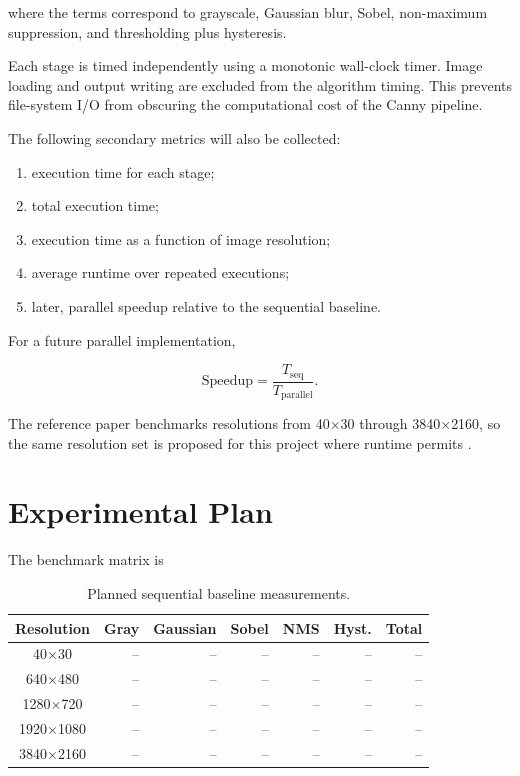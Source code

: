 \documentclass[conference]{IEEEtran}
\begin{document}
where the terms correspond to grayscale, Gaussian blur, Sobel, non-maximum
suppression, and thresholding plus hysteresis.

Each stage is timed independently using a monotonic wall-clock timer.
Image loading and output writing are excluded from the algorithm timing.
This prevents file-system I/O from obscuring the computational cost of the
Canny pipeline.

The following secondary metrics will also be collected:

\begin{enumerate}
    \item execution time for each stage;
    \item total execution time;
    \item execution time as a function of image resolution;
    \item average runtime over repeated executions;
    \item later, parallel speedup relative to the sequential baseline.
\end{enumerate}

For a future parallel implementation,

\begin{equation}
\mathrm{Speedup}
=
\frac{T_{\mathrm{seq}}}{T_{\mathrm{parallel}}}.
\end{equation}

The reference paper benchmarks resolutions from 40$\times$30 through
3840$\times$2160, so the same resolution set is proposed for this project
where runtime permits \cite{horvath2023}.

\section{Experimental Plan}

The benchmark matrix is

\begin{table}[H]
\centering
\caption{Planned sequential baseline measurements.}
\begin{tabular}{c|r|r|r|r|r|r}
\toprule
Resolution & Gray & Gaussian & Sobel & NMS & Hyst. & Total\\
\midrule
40$\times$30 & -- & -- & -- & -- & -- & --\\
640$\times$480 & -- & -- & -- & -- & -- & --\\
1280$\times$720 & -- & -- & -- & -- & -- & --\\
1920$\times$1080 & -- & -- & -- & -- & -- & --\\
3840$\times$2160 & -- & -- & -- & -- & -- & --\\
\bottomrule
\end{tabular}
\end{table}
\end{document}
